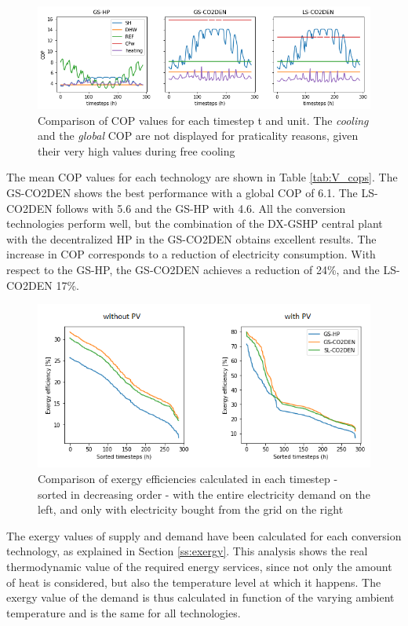 \documentclass{article}
\begin{document}
\begin{figure}[tph]
	\centering
	\includegraphics[width=1\linewidth]{Images/V_COP}
	\caption{Comparison of COP values for each timestep t and unit. The \textit{cooling } and the \textit{global} COP are not displayed for praticality reasons, given their very high values during free cooling}
	\label{fig:v_cop}
\end{figure}

The mean COP values for each technology are shown in Table \ref{tab:V_cops}. The GS-CO2DEN shows the best performance with a global COP of 6.1. The LS-CO2DEN follows with 5.6 and the GS-HP with 4.6. All the conversion technologies perform well, but the combination of the DX-GSHP central plant with the decentralized HP in the GS-CO2DEN obtains excellent results. The increase in COP corresponds to a reduction of electricity consumption. With respect to the GS-HP, the GS-CO2DEN achieves a reduction of 24\%, and the LS-CO2DEN 17\%.



\begin{figure}[tph]
	\centering
	\includegraphics[width=0.875\linewidth]{Images/V_EXE}
	\caption{Comparison of exergy efficiencies calculated in each timestep - sorted in decreasing order - with the entire electricity demand on the left, and only with electricity bought from the grid on the right}
	\label{fig:v_exe}
\end{figure}

The exergy values of supply and demand have been calculated for each conversion technology, as explained in Section \ref{ss:exergy}. This analysis shows the real thermodynamic value of the required energy services, since not only the amount of heat is considered, but also the temperature level at which it happens. The exergy value of the demand is thus calculated in function of the varying ambient temperature and is the same for all technologies.\\
\end{document}
